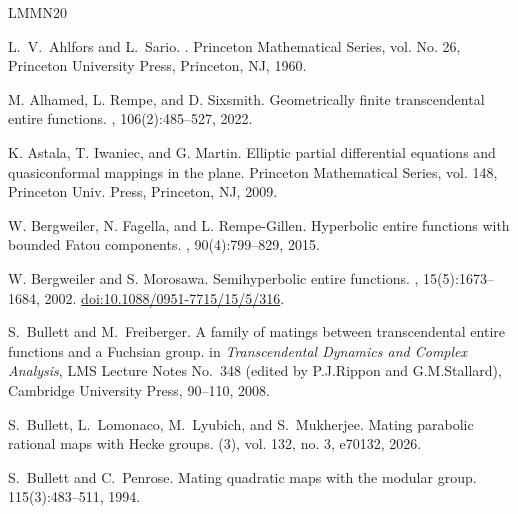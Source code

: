 \documentclass[11pt,a4paper, oneside]{amsart}
\theoremstyle{definition}
\theoremstyle{remark}
\numberwithin{equation}{section}
\begin{document}
\begin{thebibliography}{LMMN20}

L.~V.~Ahlfors and L.~Sario.
.
\newblock Princeton Mathematical Series, vol. No. 26, Princeton University Press, Princeton, NJ, 1960.

M. Alhamed, L. Rempe, and D. Sixsmith.
\newblock Geometrically finite transcendental entire functions.
, 106(2):485--527, 2022.

K. Astala, T. Iwaniec, and G. Martin.
\newblock Elliptic partial differential equations and quasiconformal mappings in the plane.
\newblock Princeton Mathematical Series, vol. 148, 
\newblock Princeton Univ. Press, 
\newblock Princeton, NJ, 2009.

W. Bergweiler, N. Fagella, and L. Rempe-Gillen.
\newblock Hyperbolic entire functions with bounded Fatou components.
, 90(4):799--829, 2015.


W. Bergweiler and S. Morosawa.
\newblock Semihyperbolic entire functions.
, 15(5):1673--1684, 2002.
\newblock \href{https://doi.org/10.1088/0951-7715/15/5/316}{doi:10.1088/0951-7715/15/5/316}.


S.~Bullett and M.~Freiberger.
\newblock A family of matings between transcendental entire functions and a Fuchsian group.
\newblock in \emph{Transcendental Dynamics and Complex Analysis}, LMS Lecture Notes No.~348 (edited by P.J.Rippon and G.M.Stallard), 
\newblock Cambridge University Press, 90--110, 2008.


S.~Bullett, L.~Lomonaco, M.~Lyubich, and S.~Mukherjee.
\newblock Mating parabolic rational maps with Hecke groups.
 (3), vol. 132, no. 3, e70132, 2026.


S.~Bullett and C.~Penrose.
\newblock Mating quadratic maps with the modular group.
 115(3):483–511, 1994.



\end{thebibliography}
\end{document}
